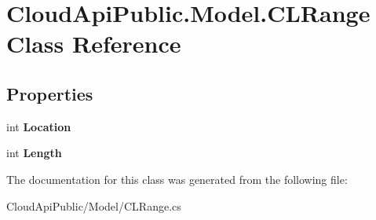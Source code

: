 \hypertarget{class_cloud_api_public_1_1_model_1_1_c_l_range}{\section{Cloud\-Api\-Public.\-Model.\-C\-L\-Range Class Reference}
\label{class_cloud_api_public_1_1_model_1_1_c_l_range}
}
\subsection*{Properties}
\begin{DoxyCompactItemize}
\item 
\hypertarget{class_cloud_api_public_1_1_model_1_1_c_l_range_a05c6c1d8865d8e653e9d49c99132c7ca}{int {\bfseries Location}}\label{class_cloud_api_public_1_1_model_1_1_c_l_range_a05c6c1d8865d8e653e9d49c99132c7ca}

\item 
\hypertarget{class_cloud_api_public_1_1_model_1_1_c_l_range_aa7699803a7001782c3e23a4cf7414d70}{int {\bfseries Length}}\label{class_cloud_api_public_1_1_model_1_1_c_l_range_aa7699803a7001782c3e23a4cf7414d70}

\end{DoxyCompactItemize}


The documentation for this class was generated from the following file\-:\begin{DoxyCompactItemize}
\item 
Cloud\-Api\-Public/\-Model/C\-L\-Range.\-cs\end{DoxyCompactItemize}
